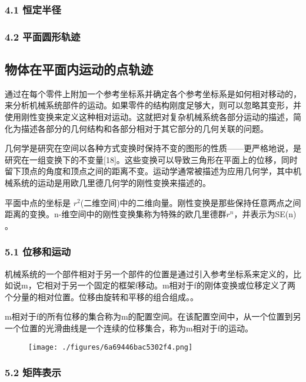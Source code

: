 \subsubsection{4.1 恒定半径}



\subsubsection{4.2 平面圆形轨迹}



\subsection{物体在平面内运动的点轨迹}

通过在每个零件上附加一个参考坐标系并确定各个参考坐标系是如何相对移动的，来分析机械系统部件的运动。如果零件的结构刚度足够大，则可以忽略其变形，并使用刚性变换来定义这种相对运动。这就把对复杂机械系统各部分运动的描述，简化为描述各部分的几何结构和各部分相对于其它部分的几何关联的问题。

几何学是研究在空间以各种方式变换时保持不变的图形的性质——更严格地说，是研究在一组变换下的不变量[18]。这些变换可以导致三角形在平面上的位移，同时留下顶点的角度和顶点之间的距离不变。运动学通常被描述为应用几何学，其中机械系统的运动是用欧几里德几何学的刚性变换来描述的。

平面中点的坐标是 $r^2$(二维空间)中的二维向量。刚性变换是那些保持任意两点之间距离的变换。n-维空间中的刚性变换集称为特殊的欧几里德群$r^n$，并表示为SE(n) 。

\subsubsection{5.1 位移和运动}

机械系统的一个部件相对于另一个部件的位置是通过引入参考坐标系来定义的，比如说m，它相对于另一个固定的框架f移动。m相对于f的刚体变换或位移定义了两个分量的相对位置。位移由旋转和平移的组合组成。。

m相对于f的所有位移的集合称为m的配置空间。在该配置空间中，从一个位置到另一个位置的光滑曲线是一个连续的位移集合，称为m相对于f的运动。

\begin{figure}[ht]
\centering
\texttt{[image: ./figures/6a69446bac5302f4.png]}
\caption \label{fig_YDX_2}
\end{figure}

\subsubsection{5.2 矩阵表示}



